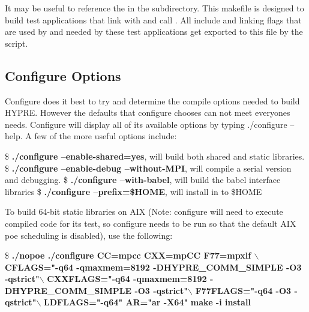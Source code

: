 It may be useful to reference the  in the 
subdirectory.  This makefile is designed to build test applications
that link with and call \hypre{}.  All include and linking flags that
are used by \hypre{} and needed by these test applications get
exported to this file by the  script.

\subsection{Configure Options}

Configure does it best to try and determine the
compile options needed to build HYPRE. However the defaults that
configure chooses can not meet everyones needs. Configure will display
all of its available options by typing ./configure --help. A few of the
more useful options include: 
\begin{ttfamily}
\begin{mdseries}
\linebreak
\$ \textbf{./configure --enable-shared=yes}, will build both 
shared and static libraries.\linebreak
\$ \textbf{./configure --enable-debug --without-MPI}, will compile 
a serial version and debugging.\linebreak
\$ \textbf{./configure --with-babel}, will build the babel interface 
libraries\linebreak
\$ \textbf{./configure --prefix=\$HOME}, will install \hypre{} in 
to \$HOME\linebreak
\end{mdseries}
\end{ttfamily}
To build 64-bit static libraries on AIX (Note: configure will need to
execute compiled code for its test, so configure needs to be run so
that the default AIX poe scheduling is disabled), use the following: 
\begin{ttfamily}
\begin{mdseries}
\linebreak
\$ \textbf{./nopoe ./configure CC=mpcc CXX=mpCC F77=mpxlf $\backslash$}\linebreak
\textbf{CFLAGS="-q64 -qmaxmem=8192 -DHYPRE\_COMM\_SIMPLE -O3 
-qstrict"$\backslash$}\linebreak
\textbf{CXXFLAGS="-q64 -qmaxmem=8192 -DHYPRE\_COMM\_SIMPLE -O3 
-qstrict"$\backslash$}\linebreak
\textbf{F77FLAGS="-q64 -O3 -qstrict"$\backslash$}\linebreak
\textbf{LDFLAGS="-q64" AR="ar -X64"}\linebreak
\textbf{make -i install}\linebreak
\end{mdseries}
\end{ttfamily}
